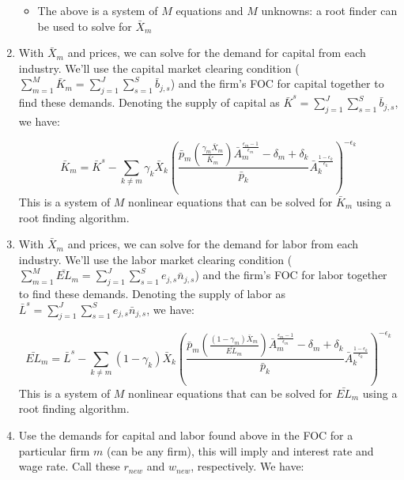 \documentclass[letterpaper,12pt]{article}
\theoremstyle{definition}
\begin{document}
\begin{spacing}{1.5}
\begin{enumerate}
\begin{itemize}
	\item The above is a system of $M$ equations and $M$ unknowns: a root finder can be used to solve for $\bar{X}_{m}$
	\end{itemize}

\item With $\bar{X}_{m}$ and prices, we can solve for the demand for capital from each industry.  We'll use the capital market clearing condition ($\sum_{m=1}^{M} \bar{K}_{m}=\sum_{j=1}^{J}\sum_{s=1}^{S} \bar{b}_{j,s}$) and the firm's FOC for capital together to find these demands.  Denoting the supply of capital as $\bar{K}^{s}=\sum_{j=1}^{J}\sum_{s=1}^{S} \bar{b}_{j,s}$, we have:

	\begin{equation}
	\bar{K}_{m} = \bar{K}^{s} - \sum_{k \neq m} \gamma_{k}\bar{X}_{k}\left(\frac{\bar{p}_{m}\left(\frac{\gamma_{m}\bar{X}_{m}}{\bar{K}_{m}}\right)\bar{A}_{m}^{\frac{\epsilon_{m}-1}{\epsilon_{m}}}-\delta_{m}+\delta_{k}}{\bar{p}_{k}}\bar{A}_{k}^{\frac{1-\epsilon_{k}}{\epsilon_{k}}}\right)^{-\epsilon_{k}}
	\end{equation}
	This is a system of $M$ nonlinear equations that can be solved for $\bar{K}_{m}$ using a root finding algorithm.
	
\item With $\bar{X}_{m}$ and prices, we can solve for the demand for labor from each industry.  We'll use the labor market clearing condition ($\sum_{m=1}^{M} \bar{EL}_{m}=\sum_{j=1}^{J}\sum_{s=1}^{S}e_{j,s} \bar{n}_{j,s}$) and the firm's FOC for labor together to find these demands.  Denoting the supply of labor as $\bar{L}^{s}=\sum_{j=1}^{J}\sum_{s=1}^{S} e_{j,s}\bar{n}_{j,s}$, we have:

	\begin{equation}
	\bar{EL}_{m} = \bar{L}^{s} - \sum_{k\neq m} (1- \gamma_{k})\bar{X}_{k}\left(\frac{\bar{p}_{m}\left(\frac{(1-\gamma_{m})\bar{X}_{m}}{\bar{EL}_{m}}\right)\bar{A}_{m}^{\frac{\epsilon_{m}-1}{\epsilon_{m}}}-\delta_{m}+\delta_{k}}{\bar{p}_{k}}\bar{A}_{k}^{\frac{1-\epsilon_{k}}{\epsilon_{k}}}\right)^{-\epsilon_{k}}
	\end{equation}
	This is a system of $M$ nonlinear equations that can be solved for $\bar{EL}_{m}$ using a root finding algorithm.
	
\item Use the demands for capital and labor found above in the FOC for a particular firm $m$ (can be any firm), this will imply and interest rate and wage rate.  Call these $r_{new}$ and $w_{new}$, respectively.  We have:


\end{enumerate}
\end{spacing}
\end{document}
